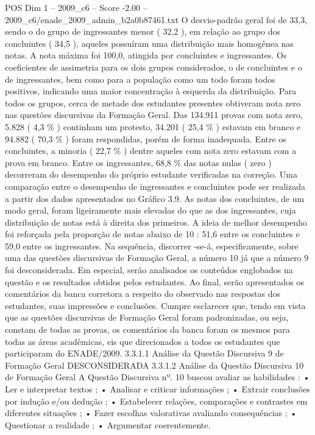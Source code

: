 \begin{textsample}{POS Dim 1 – 2009\_c6 – Score -2.00 – 2009\_c6/enade\_2009\_admin\_b2a0b87461.txt}
O desvio-padrão geral foi de 33,3, sendo o do grupo de ingressantes menor ( 32,2 ), em relação ao grupo dos concluintes ( 34,5 ), aqueles possuíram uma distribuição mais homogênea nas notas.
A nota máxima foi 100,0, atingida por concluintes e ingressantes.
Os coeficientes de assimetria para os dois grupos considerados, o de concluintes e o de ingressantes, bem como para a população como um todo foram todos positivos, indicando uma maior concentração à esquerda da distribuição.
Para todos os grupos, cerca de metade dos estudantes presentes obtiveram nota zero nas questões discursivas da Formação Geral.
Das 134.911 provas com nota zero, 5.828 ( 4,3 \% ) continham um protesto, 34.201 ( 25,4 \% ) estavam em branco e 94.882 ( 70,3 \% ) foram respondidas, porém de forma inadequada.
Entre os concluintes, a minoria ( 22,7 \% ) dentre aqueles com nota zero estavam com a prova em branco.
Entre os ingressantes, 68,8 \% das notas nulas ( zero ) decorreram do desempenho do próprio estudante verificadas na correção.
Uma comparação entre o desempenho de ingressantes e concluintes pode ser realizada a partir dos dados apresentados no Gráfico 3.9.
As notas dos concluintes, de um modo geral, foram ligeiramente mais elevadas do que as dos ingressantes, cuja distribuição de notas está à direita dos primeiros.
A ideia de melhor desempenho foi reforçada pela proporção de notas abaixo de 10 : 51,6 entre os concluintes e 59,0 entre os ingressantes.
Na sequência, discorrer -se-á, especificamente, sobre uma das questões discursivas de Formação Geral, a número 10 já que a número 9 foi desconsiderada.
Em especial, serão analisados os conteúdos englobados na questão e os resultados obtidos pelos estudantes.
Ao final, serão apresentados os comentários da banca corretora a respeito do observado nas respostas dos estudantes, suas impressões e conclusões.
Cumpre esclarecer que, tendo em vista que as questões discursivas de Formação Geral foram padronizadas, ou seja, constam de todas as provas, os comentários da banca foram os mesmos para todas as áreas acadêmicas, eis que direcionados a todos os estudantes que participaram do ENADE/2009. 3.3.1.1 Análise da Questão Discursiva 9 de Formação Geral DESCONSIDERADA 3.3.1.2 Análise da Questão Discursiva 10 de Formação Geral A Questão Discursiva nº. 10 buscou avaliar as habilidades : • Ler e interpretar textos ; • Analisar e criticar informações ; • Extrair conclusões por indução e/ou dedução ; • Estabelecer relações, comparações e contrastes em diferentes situações ; • Fazer escolhas valorativas avaliando consequências ; • Questionar a realidade ; • Argumentar coerentemente.

\end{textsample}
